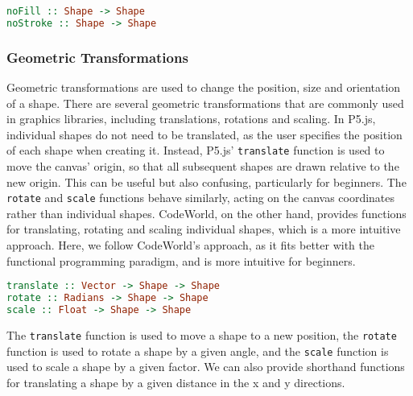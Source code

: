 \documentclass[../main.tex]{subfiles}
\begin{document}
                \begin{lstlisting}[language={Haskell}, label={lst:shorthandColour}, caption={The shorthand colour 
                    transformation functions.}]
noFill :: Shape -> Shape
noStroke :: Shape -> Shape\end{lstlisting}

            \subsubsection{Geometric Transformations}
                Geometric transformations are used to change the position, size and orientation
                    of a shape.
                There are several geometric transformations that are commonly used in graphics
                    libraries, including translations, rotations and scaling.
                In P5.js, individual shapes do not need to be translated, as the user specifies
                    the position of each shape when creating it.
                Instead, P5.js' \texttt{translate} function is used to move the canvas' origin,
                    so that all subsequent shapes are drawn relative to the new origin.
                This can be useful but also confusing, particularly for beginners.
                The \texttt{rotate} and \texttt{scale} functions behave similarly, acting on
                    the canvas coordinates rather than individual shapes.
                CodeWorld, on the other hand, provides functions for translating, rotating and
                    scaling individual shapes, which is a more intuitive approach.
                Here, we follow CodeWorld's approach, as it fits better with the functional
                    programming paradigm, and is more intuitive for beginners.

                \begin{lstlisting}[language={Haskell}, label={lst:geometric}, caption={The geometric transformation 
                    functions.}]
translate :: Vector -> Shape -> Shape
rotate :: Radians -> Shape -> Shape
scale :: Float -> Shape -> Shape\end{lstlisting}

                The \texttt{translate} function is used to move a shape to a new position, the
                    \texttt{rotate} function is used to rotate a shape by a given angle, and the
                    \texttt{scale} function is used to scale a shape by a given factor.
                We can also provide shorthand functions for translating a shape by a given
                    distance in the x and y directions.
\end{document}

